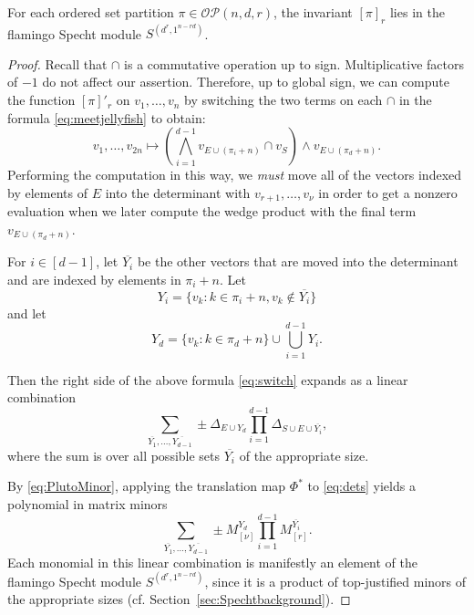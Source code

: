 \documentclass[ALCO, Unicode]{cedram}
\numberwithin{equation}{section}
\newcommand{\ordsetpart}{\mathcal{OP}}
\begin{document}
\begin{theorem}\label{thm:inspecht}
For each ordered set partition $\pi \in \ordsetpart(n,d,r)$, the invariant $[\pi]_r$ lies in the flamingo Specht module $S^{(d^r, 1^{n-rd})}$.
\end{theorem}
\begin{proof}
Recall that $\cap$ is a commutative operation up to sign. Multiplicative factors of $-1$ do not affect our assertion. Therefore, up to global sign, we can compute the function $[\pi]'_r$ on $v_1,\dots,v_n$ by switching the two terms on each $\cap$ in the formula \eqref{eq:meetjellyfish} to obtain: 
\begin{equation}\label{eq:switch}
v_1,\dots,v_{2n} \mapsto \left(\bigwedge_{i=1}^{d-1} v_{E \cup (\pi_i+n)} \cap v_{S}\right) \wedge v_{ E\cup (\pi_d+n)}.
\end{equation}
Performing the computation in this way, we \emph{must} move all of the vectors indexed by elements of $E$ into the determinant with $v_{r+1},\ldots,v_{\nu}$ in order to get a nonzero evaluation when we later compute the wedge product with the final term $v_{E \cup (\pi_d+n)}$. 

For $i \in [d-1]$, let $\overline{Y_i}$  be the other vectors that are moved into the determinant and are indexed by elements in $\pi_i+n$. 
Let \[
Y_i = \{ v_k : k \in \pi_i+n, v_k \notin \overline{Y_i}\}
\]
and let 
\[Y_d = \{v_k : k \in \pi_d + n \} \cup \bigcup_{i=1}^{d-1}  Y_i.
\]

Then the right side of the above formula \eqref{eq:switch} expands as a linear combination 
\begin{equation}\label{eq:dets}
\sum_{\overline{Y_1},\dots,\overline{Y_{d-1}}}\pm \Delta_{E \cup Y_d}\prod_{i=1}^{d-1}\Delta_{  S \cup E\cup \overline{Y_i}},
\end{equation}
where the sum is over all possible sets $\overline{Y_i}$ of the appropriate size.

By \eqref{eq:PlutoMinor}, applying the translation map $\Phi^*$ to \eqref{eq:dets} yields a polynomial in matrix minors
\begin{equation}
\sum_{\overline{Y_1},\dots,\overline{Y_{d-1}}}\pm M^{Y_d}_{[\nu]}\prod_{i=1}^{d-1}M^{\overline{Y_i}}_{[r]}.
\end{equation}
Each monomial in this linear combination is manifestly an element of the flamingo Specht module $S^{(d^r, 1^{n-rd})}$, since it is a product of top-justified minors of the appropriate sizes (cf. Section~\ref{sec:Spechtbackground}). 
\end{proof}
\end{document}
